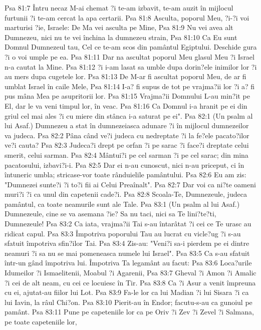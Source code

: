 Psa 81:7  Întru necaz M-ai chemat ?i te-am izbavit, te-am auzit în mijlocul furtunii ?i te-am cercat la apa certarii.
Psa 81:8  Asculta, poporul Meu, ?i-?i voi marturisi ?ie, Israele: De Ma vei asculta pe Mine,
Psa 81:9  Nu vei avea alt Dumnezeu, nici nu te vei închina la dumnezeu strain,
Psa 81:10  Ca Eu sunt Domnul Dumnezeul tau, Cel ce te-am scos din pamântul Egiptului. Deschide gura ?i o voi umple pe ea.
Psa 81:11  Dar na ascultat poporul Meu glasul Meu ?i Israel n-a cautat la Mine.
Psa 81:12  ?i i-am lasat sa umble dupa dorin?ele inimilor lor ?i au mers dupa cugetele lor.
Psa 81:13  De M-ar fi ascultat poporul Meu, de ar fi umblat Israel în caile Mele,
Psa 81:14  I-a? fi supus de tot pe vrajma?ii lor ?i a? fi pus mâna Mea pe asupritorii lor.
Psa 81:15  Vrajma?ii Domnului L-au min?it pe El, dar le va veni timpul lor, în veac.
Psa 81:16  Ca Domnul i-a hranit pe ei din griul cel mai ales ?i cu miere din stânca i-a saturat pe ei".
Psa 82:1  (Un psalm al lui Asaf.) Dumnezeu a stat în dumnezeiasca adunare ?i în mijlocul dumnezeilor va judeca.
Psa 82:2  Pâna când ve?i judeca cu nedreptate ?i la fe?ele pacato?ilor ve?i cauta?
Psa 82:3  Judeca?i drept pe orfan ?i pe sarac ?i face?i dreptate celui smerit, celui sarman.
Psa 82:4  Mântui?i pe cel sarman ?i pe cel sarac; din mina pacatosului, izbavi?i-i.
Psa 82:5  Dar ei n-au cunoscut, nici n-au priceput, ci în întuneric umbla; stricase-vor toate rânduielile pamântului.
Psa 82:6  Eu am zis: "Dumnezei sunte?i ?i to?i fii ai Celui Preaînalt".
Psa 82:7  Dar voi ca ni?te oameni muri?i ?i ca unul din capetenii cade?i.
Psa 82:8  Scoala-Te, Dumnezeule, judeca pamântul, ca toate neamurile sunt ale Tale.
Psa 83:1  (Un psalm al lui Asaf.) Dumnezeule, cine se va asemana ?ie? Sa nu taci, nici sa Te lini?te?ti, Dumnezeule!
Psa 83:2  Ca iata, vrajma?ii Tai s-au întarâtat ?i cei ce Te urasc au ridicat capul.
Psa 83:3  Împotriva poporului Tau au lucrat cu vicle?ug ?i s-au sfatuit împotriva sfin?ilor Tai.
Psa 83:4  Zis-au: "Veni?i sa-i pierdem pe ei dintre neamuri ?i sa nu se mai pomeneasca numele lui Israel".
Psa 83:5  Ca s-au sfatuit într-un gând împotriva lui. Împotriva Ta legamânt au facut:
Psa 83:6  Loca?urile Idumeilor ?i Ismaelitenii, Moabul ?i Agarenii,
Psa 83:7  Gheval ?i Amon ?i Amalic ?i cei de alt neam, cu cei ce locuiesc în Tir.
Psa 83:8  Ca ?i Asur a venit împreuna cu ei, ajutat-au fiilor lui Lot.
Psa 83:9  Fa-le lor ca lui Madian ?i lui Sisara ?i ca lui Iavin, la râul Chi?on.
Psa 83:10  Pierit-au în Endor; facutu-s-au ca gunoiul pe pamânt.
Psa 83:11  Pune pe capeteniile lor ca pe Oriv ?i Zev ?i Zevel ?i Salmana, pe toate capeteniile lor,

